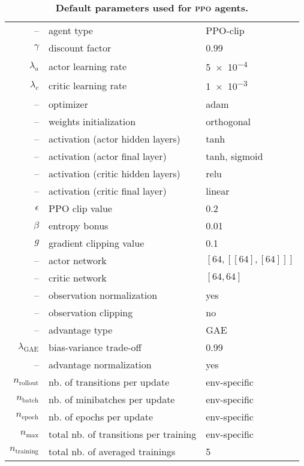 \begin{table}
    \footnotesize
    \caption{\textbf{Default parameters used for \textsc{ppo} agents.}}
    \label{table:default_ppo_parameters}
    \centering
    \begin{tabular}{rll}
        \toprule
        --					& agent type					& PPO-clip\\
	$\gamma$ 			& discount factor				& 0.99\\
	$\lambda_a$ 			& actor learning rate				& \num{5e-4}\\
	$\lambda_c$ 			& critic learning rate				& \num{1e-3}\\
	--		 			& optimizer					& adam\\
	--					& weights initialization			& orthogonal\\
	--	 				& activation (actor hidden layers)	& tanh\\
	-- 					& activation (actor final layer)		& tanh, sigmoid\\
	--	 				& activation (critic hidden layers)	& relu\\
	-- 					& activation (critic final layer)		& linear\\
	$\epsilon$ 			& PPO clip value				& 0.2\\
	$\beta$				& entropy bonus				& 0.01\\
	$g$					& gradient clipping value			& 0.1\\	
	-- 					& actor network					& $[64, [[64],[64]]]$\\
	-- 					& critic network					& $[64, 64]$\\
	--					& observation normalization		& yes\\
	--					& observation clipping			& no\\
	--					& advantage type				& GAE\\
	$\lambda_\text{GAE}$	& bias-variance trade-off			& 0.99\\
	--					& advantage normalization		& yes\\\midrule
	$n_\text{rollout}$ 		& nb. of transitions per update		& env-specific\\
	$n_\text{batch}$ 		& nb. of minibatches per update 	& env-specific\\
	$n_\text{epoch}$		& nb. of epochs per update		& env-specific\\
	$n_\text{max}$			& total nb. of transitions per training	& env-specific\\
	$n_\text{training}$		& total nb. of averaged trainings	& 5\\
        \bottomrule
    \end{tabular}
\end{table}
